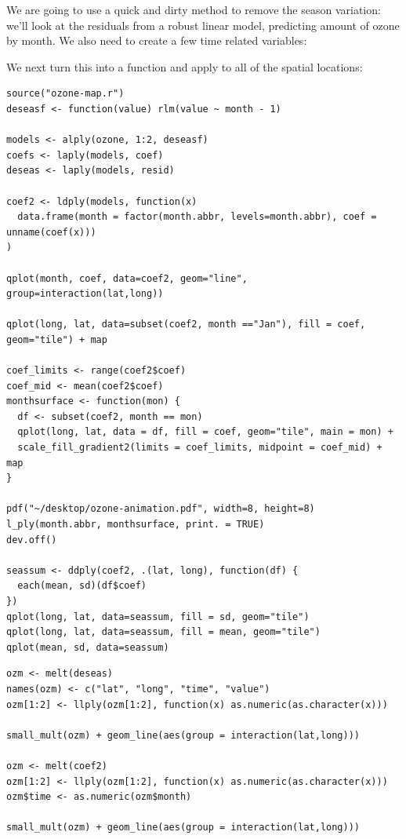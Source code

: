 \documentclass[letterpage]{scrartcl}
\begin{document}
We are going to use a quick and dirty method to remove the season variation: we'll look at the residuals from a robust linear model, predicting amount of ozone by month.  We also need to create a few time related variables:

% 
%

%
% 

% 

We next turn this into a function and apply to all of the spatial locations:

\begin{verbatim}
source("ozone-map.r")
deseasf <- function(value) rlm(value ~ month - 1)

models <- alply(ozone, 1:2, deseasf)
coefs <- laply(models, coef)
deseas <- laply(models, resid)

coef2 <- ldply(models, function(x) 
  data.frame(month = factor(month.abbr, levels=month.abbr), coef = unname(coef(x)))
)

qplot(month, coef, data=coef2, geom="line", group=interaction(lat,long))

qplot(long, lat, data=subset(coef2, month =="Jan"), fill = coef, geom="tile") + map

coef_limits <- range(coef2$coef)
coef_mid <- mean(coef2$coef)
monthsurface <- function(mon) {
  df <- subset(coef2, month == mon)
  qplot(long, lat, data = df, fill = coef, geom="tile", main = mon) + 
  scale_fill_gradient2(limits = coef_limits, midpoint = coef_mid) + map
}

pdf("~/desktop/ozone-animation.pdf", width=8, height=8)
l_ply(month.abbr, monthsurface, print. = TRUE)
dev.off()

seassum <- ddply(coef2, .(lat, long), function(df) {
  each(mean, sd)(df$coef)
})
qplot(long, lat, data=seassum, fill = sd, geom="tile")
qplot(long, lat, data=seassum, fill = mean, geom="tile")
qplot(mean, sd, data=seassum)
\end{verbatim}

\begin{verbatim}
ozm <- melt(deseas)
names(ozm) <- c("lat", "long", "time", "value")
ozm[1:2] <- llply(ozm[1:2], function(x) as.numeric(as.character(x)))

small_mult(ozm) + geom_line(aes(group = interaction(lat,long)))

ozm <- melt(coef2)
ozm[1:2] <- llply(ozm[1:2], function(x) as.numeric(as.character(x)))
ozm$time <- as.numeric(ozm$month)

small_mult(ozm) + geom_line(aes(group = interaction(lat,long)))

\end{verbatim}
\end{document}
